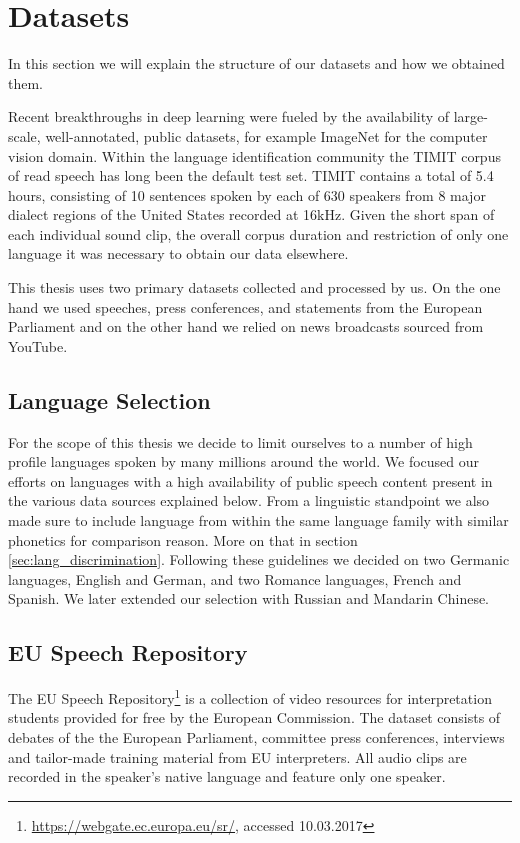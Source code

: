 \section{Datasets}
\label{sec:datasets}
	In this section we will explain the structure of our datasets and how we obtained them.

	Recent breakthroughs in deep learning were fueled by the availability of large-scale, well-annotated, public datasets, for example ImageNet \cite{ILSVRC15} for the computer vision domain. Within the language identification community the TIMIT corpus of read speech \cite{garofolo1993darpa} has long been the default test set. TIMIT contains a total of 5.4 hours, consisting of 10 sentences spoken by each of 630 speakers from 8 major dialect regions of the United States recorded at 16kHz. Given the short span of each individual sound clip, the overall corpus duration and restriction of only one language it was necessary to obtain our data elsewhere. 
  
  	This thesis uses two primary datasets collected and processed by us. On the one hand we used speeches, press conferences, and statements from the European Parliament and on the other hand we relied on news broadcasts sourced from YouTube.

\subsection{Language Selection}  
For the scope of this thesis we decide to limit ourselves to a number of high profile languages spoken by many millions around the world. We focused our efforts on languages with a high availability of public speech content present in the various data sources explained below. From a linguistic standpoint we also made sure to include language from within the same language family with  similar phonetics for comparison reason. More on that in section \ref{sec:lang_discrimination}. Following these guidelines we decided on two Germanic languages, English and German, and two Romance languages, French and Spanish. We later extended our selection with Russian and Mandarin Chinese.

\subsection{EU Speech Repository}

	The EU Speech Repository\footnote{\url{https://webgate.ec.europa.eu/sr/}, accessed 10.03.2017} is a collection of video resources for interpretation students provided for free by the European Commission. The dataset consists of debates of the the European Parliament, committee press conferences, interviews and tailor-made training material from EU interpreters. All audio clips are recorded in the speaker's native language and feature only one speaker.
	
